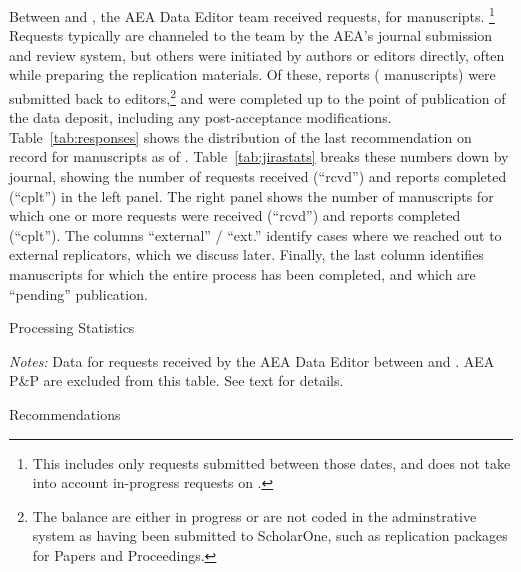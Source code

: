 \documentclass[PP]{AEA}
\begin{document}
Between \firstday{} and \lastday{}, the AEA Data Editor team  received
\jiraissues{} requests,  for \jiramcs{} manuscripts.%
%
\footnote{This includes only requests submitted between those dates, and does not take into account in-progress requests on \firstday{}.}
%
Requests typically are channeled to the team by the AEA's journal submission and review system, but others were initiated by authors or editors directly, often while preparing the replication materials. Of these,  \jiraissuescplt{} reports (\jiramcscplt{} manuscripts) were submitted back to editors,\footnote{The balance are either in progress or are not coded in the adminstrative system as having been submitted to ScholarOne, such as replication packages for Papers and Proceedings.} and \jiramcspending{} were completed up to the point of publication of the data deposit, including any post-acceptance modifications.  Table~\ref{tab:responses} shows the distribution of the last recommendation on record for manuscripts as of \lastday{}.  Table~\ref{tab:jirastats} breaks these numbers down by journal, showing the number of requests received (``rcvd'') and  reports completed (``cplt'') in the left panel. The right panel shows the number of manuscripts for which one or more requests were received (``rcvd'') and reports completed (``cplt''). The columns ``external'' / ``ext.'' identify cases where we reached out to external replicators, which we discuss later. Finally, the last column identifies manuscripts for which the entire process has been completed, and which are ``pending'' publication.
%

\begin{table}[]
    \caption{Processing Statistics}
    \label{tab:jirastats}
    \small
    \begin{threeparttable}
    \centering
    
    \begin{tablenotes}
    \item[] \textit{Notes:} Data for requests received by the AEA Data Editor between \firstday{} and \lastday{}. AEA P\&P are excluded from this table. See text for details.
    \end{tablenotes}
 \end{threeparttable}
   \end{table}


\begin{table}[t]
	\caption{Recommendations}
	\label{tab:responses}
	\centering
	
\end{table}
\end{document}
